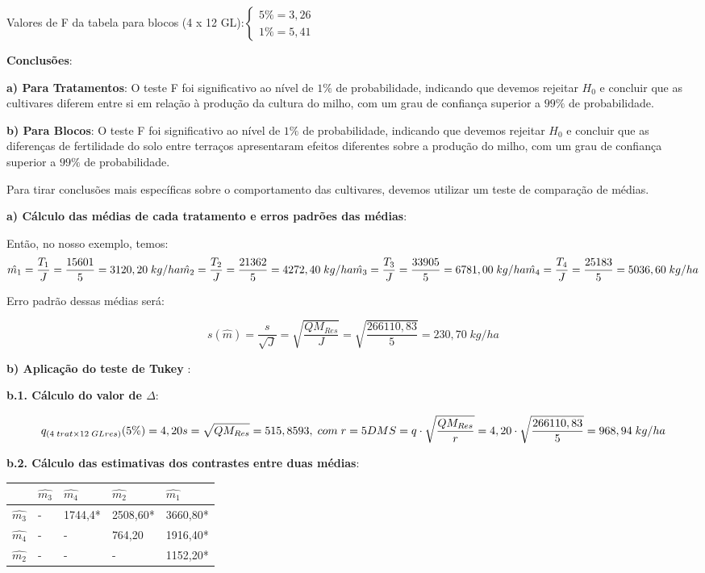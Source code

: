 \documentclass[
]{book}
\begin{document}
Valores de F da tabela para blocos (4 x 12 GL):\(\begin{cases} 5\%=3,26 \\ 1\%=5,41 \end{cases}\)

\textbf{Conclusões}:

\textbf{a) Para Tratamentos}: O teste F foi significativo ao nível de \(1\%\) de probabilidade, indicando que devemos rejeitar \(H_0\) e concluir que as cultivares diferem entre si em relação à produção da cultura do milho, com um grau de confiança superior a \(99\%\) de probabilidade.

\textbf{b) Para Blocos}: O teste F foi significativo ao nível de \(1\%\) de probabilidade, indicando que devemos rejeitar \(H_0\) e concluir que as diferenças de fertilidade do solo entre terraços apresentaram efeitos diferentes sobre a produção do milho, com um grau de confiança superior a \(99\%\) de probabilidade.

Para tirar conclusões mais específicas sobre o comportamento das cultivares, devemos utilizar um teste de comparação de médias.

\textbf{a) Cálculo das médias de cada tratamento e erros padrões das médias}:

Então, no nosso exemplo, temos:
\[
\hat{m_1} = \frac{T_1}{J}=\frac{15601}{5}=3120,20\;kg/ha\\
\hat{m_2} = \frac{T_2}{J}=\frac{21362}{5}=4272,40\;kg/ha\\
\hat{m_3} = \frac{T_3}{J}=\frac{33905}{5}=6781,00\;kg/ha\\
\hat{m_4} = \frac{T_4}{J}=\frac{25183}{5}=5036,60\;kg/ha\\
\]

Erro padrão dessas médias será:

\[
s(\hat{m}) = \frac{s}{\sqrt{J}}=\sqrt{\frac{QM_{Res}}{J}} =\sqrt{\frac{266110,83}{5}}=230,70\;kg/ha
\]

\textbf{b) Aplicação do teste de Tukey }:

\textbf{b.1. Cálculo do valor de \(\Delta\)}:

\[
q_{(4\;trat\times12\;GLres)}(5\%) = 4,20\\
s=\sqrt{QM_{Res}}=515,8593,\;com\; r=5 \\
DMS=q\cdot\sqrt{\frac{QM_{Res}}{r}}=4,20\cdot\sqrt{\frac{266110,83}{5}}=968,94\;kg/ha
\]

\textbf{b.2. Cálculo das estimativas dos contrastes entre duas médias}:

\begin{longtable}[]{@{}lllll@{}}
\toprule
& \(\hat{m_3}\) & \(\hat{m_4}\) & \(\hat{m_2}\) & \(\hat{m_1}\)\tabularnewline
\midrule
\endhead
\(\hat{m_3}\) & - & 1744,4* & 2508,60* & 3660,80*\tabularnewline
\(\hat{m_4}\) & - & - & 764,20 & 1916,40*\tabularnewline
\(\hat{m_2}\) & - & - & - & 1152,20*\tabularnewline
\bottomrule
\end{longtable}
\end{document}
